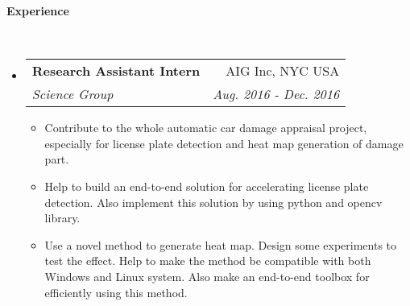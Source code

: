 \documentclass[a4paper,11pt]{article}
\makeatletter
\newcommand{\resitem}[1]{\item #1 \vspace{-2pt}}
\renewcommand{\normalsize}{\fontsize{12pt}{\baselineskip}\selectfont}
\newcommand{\resheading}[1]{{\large \colorbox{mygrey}{\begin{minipage}{\textwidth}{\textbf{#1 \vphantom{p\^{E}}}}\end{minipage}}}}
\newcommand{\ressubheading}[4]{
	\begin{tabular*}{6.5in}{l@{\extracolsep{\fill}}r}
		\textbf{#1} & #2 \\
		\textit{#3} & \textit{#4} \\
	\end{tabular*}\vspace{-6pt}}
\makeatother
\begin{document}
	\resheading{Experience}\\
	\begin{itemize}
		\item \ressubheading{\normalsize Research Assistant Intern}{AIG Inc, NYC USA}{\normalsize Science Group}{Aug. 2016 - Dec. 2016}
		\begin{itemize}
			\resitem{Contribute to the whole automatic car damage appraisal project, especially for license plate detection and heat map generation of damage part.}
			\resitem{Help to build an end-to-end solution for accelerating license plate detection. Also implement this solution by using python and opencv library.}
			\resitem{Use a novel method to generate heat map. Design some experiments to test the effect. Help to make the method be compatible with both Windows and Linux system. Also make an end-to-end toolbox for efficiently using this method.}
		\end{itemize}
	\end{itemize}
	
\end{document}
